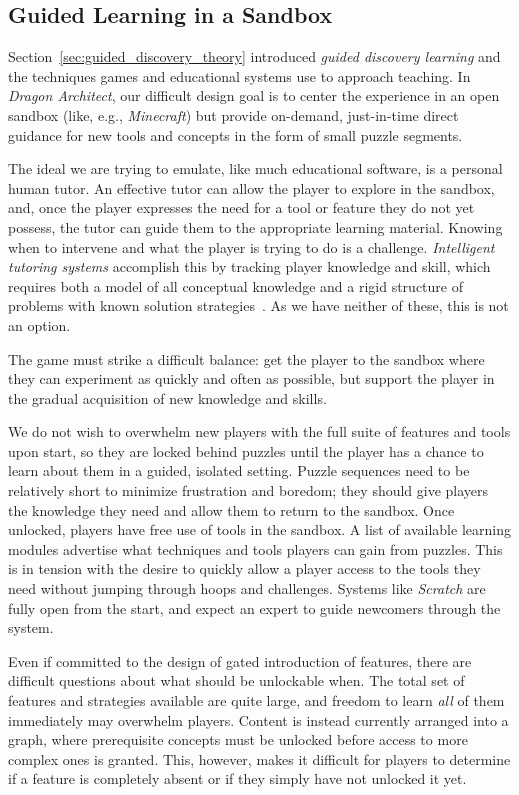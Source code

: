 \documentclass{sig-alternate}
\newcommand{\gametitle}{{\emph{Dragon Architect}}}
\begin{document}
\subsection{Guided Learning in a Sandbox}
\label{sec:direct_guidance}

Section~\ref{sec:guided_discovery_theory} introduced \emph{guided discovery learning} and the techniques games and educational systems use to approach teaching.
In \gametitle{}, our difficult design goal is to center the experience in an open sandbox (like, e.g., \emph{Minecraft}) but provide on-demand, just-in-time direct guidance for new tools and concepts in the form of small puzzle segments.

The ideal we are trying to emulate, like much educational software, is a personal human tutor.
An effective tutor can allow the player to explore in the sandbox, and, once the player expresses the need for a tool or feature they do not yet possess, the tutor can guide them to the appropriate learning material.
Knowing when to intervene and what the player is trying to do is a challenge.
\emph{Intelligent tutoring systems} accomplish this by tracking player knowledge and skill, which requires both a model of all conceptual knowledge and a rigid structure of problems with known solution strategies~\cite{koedinger06cognitive}.
As we have neither of these, this is not an option.

The game must strike a difficult balance: get the player to the sandbox where they can experiment as quickly and often as possible, but support the player in the gradual acquisition of new knowledge and skills. 

We do not wish to overwhelm new players with the full suite of features and tools upon start, so they are locked behind puzzles until the player has a chance to learn about them in a guided, isolated setting.
Puzzle sequences need to be relatively short to minimize frustration and boredom; they should give players the knowledge they need and allow them to return to the sandbox.
Once unlocked, players have free use of tools in the sandbox.
A list of available learning modules advertise what techniques and tools players can gain from puzzles.
This is in tension with the desire to quickly allow a player access to the tools they need without jumping through hoops and challenges. 
Systems like \emph{Scratch} are fully open from the start, and expect an expert to guide newcomers through the system.

Even if committed to the design of gated introduction of features, there are difficult questions about what should be unlockable when.
The total set of features and strategies available are quite large, and freedom to learn \emph{all} of them immediately may overwhelm players.
Content is instead currently arranged into a graph, where prerequisite concepts must be unlocked before access to more complex ones is granted.
This, however, makes it difficult for players to determine if a feature is completely absent or if they simply have not unlocked it yet.
\end{document}
